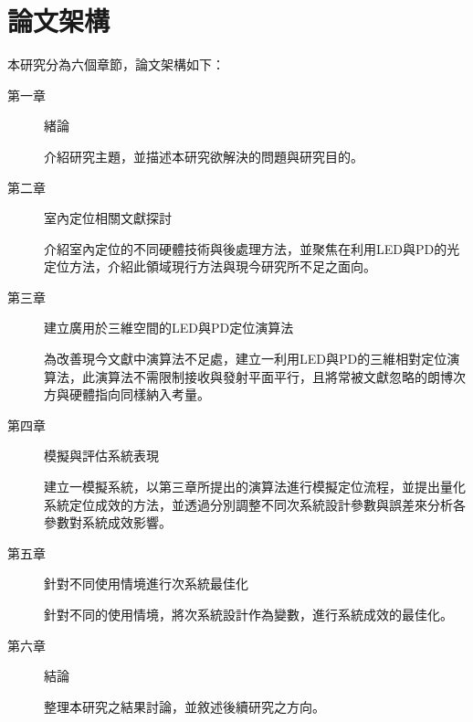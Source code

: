 \section{論文架構}
本研究分為六個章節，論文架構如下：

\begin{description}
    \item[第一章] 緒論
    
    \qquad 介紹研究主題，並描述本研究欲解決的問題與研究目的。
    
    \item[第二章] 室內定位相關文獻探討
    
    \qquad 
    介紹室內定位的不同硬體技術與後處理方法，並聚焦在利用LED與PD的光定位方法，介紹此領域現行方法與現今研究所不足之面向。
    
    \item[第三章] 建立廣用於三維空間的LED與PD定位演算法
    
    \qquad 
    為改善現今文獻中演算法不足處，建立一利用LED與PD的三維相對定位演算法，此演算法不需限制接收與發射平面平行，且將常被文獻忽略的朗博次方與硬體指向同樣納入考量。

    \item[第四章] 模擬與評估系統表現
    
    \qquad 
    建立一模擬系統，以第三章所提出的演算法進行模擬定位流程，並提出量化系統定位成效的方法，並透過分別調整不同次系統設計參數與誤差來分析各參數對系統成效影響。
    
    \item[第五章] 針對不同使用情境進行次系統最佳化
    
    \qquad 
    針對不同的使用情境，將次系統設計作為變數，進行系統成效的最佳化。
    
    \item[第六章] 結論
    
    \qquad 
    整理本研究之結果討論，並敘述後續研究之方向。
    
    \end{description}







